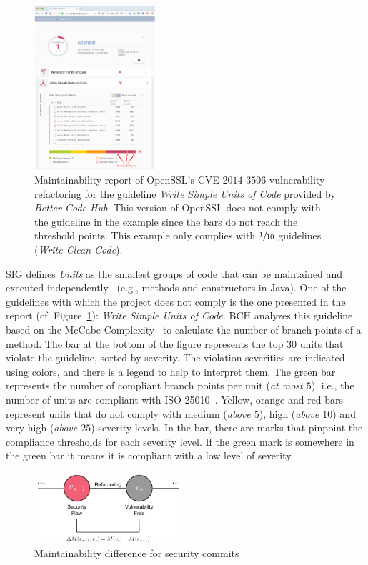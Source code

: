 \documentclass[10pt,conference]{IEEEtran}
\begin{document}
\begin{figure}[h]
 	\centering 	\includegraphics[width=0.4\textwidth]{figures/bch_report.png}
 	\caption{Maintainability report of OpenSSL's CVE-$2014$-$3506$ vulnerability
refactoring for the guideline \emph{Write Simple Units of Code} provided by
\emph{Better Code Hub}. This version of OpenSSL does not comply with the
guideline in the example since the bars do not reach the threshold points. This
example only complies with $\sfrac{1}{10}$ guidelines (\emph{Write Clean Code}).}
	\label{fig:bchrep}
\end{figure}

SIG defines \emph{Units} as the smallest groups of code that can be maintained
and executed independently~\cite{Visser:2016:OREILLY} (e.g., methods and
constructors in Java). One of the guidelines with which the project does not
comply is the one presented in the report (cf. Figure~\ref{fig:bchrep}):
\emph{Write Simple Units of Code}. BCH analyzes this guideline based on the
McCabe Complexity~\cite{1702388} to calculate the number of branch points of a
method. The bar at the bottom of the figure represents the top $30$ units that
violate the guideline, sorted by severity. The violation severities are
indicated using colors, and there is a legend to help to interpret them. The
green bar represents the number of compliant branch points per unit (\emph{at
most $5$}), i.e., the number of units are compliant with ISO
25010~\cite{iso:2011}. Yellow, orange and red bars represent units that do not
comply with medium (\emph{above $5$}), high (\emph{above $10$}) and very high
(\emph{above $25$}) severity levels. In the bar, there are marks that pinpoint
the compliance thresholds for each severity level. If the green mark is
somewhere in the green bar it means it is compliant with a low level of
severity.

\begin{figure}[h]
 	\centering 	\includegraphics[width=0.49\textwidth]{figures/commit.pdf}
 	\caption{Maintainability difference for security commits}
	\label{fig:commit}
\end{figure}
\end{document}
